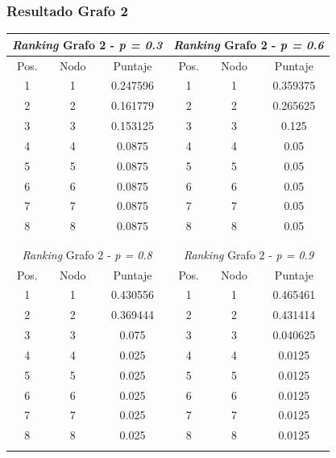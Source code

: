\subsubsection{Resultado Grafo 2}

\begin{center}
         \begin{tabular}{|c|c|c||c|c|c|}
                    \hline
                    \multicolumn{3}{|c||}{\emph{Ranking} Grafo 2 - \emph{p = 0.3}} & \multicolumn{3}{c|}{\emph{Ranking} Grafo 2 - \emph{p = 0.6}} \\ \hline
                    Pos. & Nodo & Puntaje    & Pos. & Nodo & Puntaje  \\ \hline
1 & 1 &  0.247596 & 1 & 1 & 0.359375 \\ 
2 & 2 &  0.161779 & 2 & 2 & 0.265625 \\
3 & 3 &  0.153125  & 3 & 3 & 0.125 \\
4 & 4 &  0.0875  & 4 & 4 &  0.05 \\
5 & 5 &  0.0875  & 5 & 5 &  0.05 \\
6 & 6 &  0.0875  & 6 & 6 &  0.05 \\
7 & 7 &  0.0875  & 7 & 7 &  0.05 \\
8 & 8 &  0.0875  & 8 & 8 &  0.05 \\
 \\ \hline
                    \multicolumn{6}{c}{} \\ \hline
                    \multicolumn{3}{|c||}{\emph{Ranking} Grafo 2 - \emph{p = 0.8}} & \multicolumn{3}{c|}{\emph{Ranking} Grafo 2 - \emph{p = 0.9}} \\ \hline
                    Pos. & Nodo & Puntaje    & Pos. & Nodo & Puntaje  \\ \hline
1 & 1 & 0.430556 & 1 & 1 & 0.465461 \\ 
2 & 2 & 0.369444 & 2 & 2 & 0.431414 \\
3 & 3 & 0.075  & 3 & 3 & 0.040625 \\
4 & 4 & 0.025  & 4 & 4 & 0.0125 \\
5 & 5 & 0.025  & 5 & 5 & 0.0125 \\
6 & 6 & 0.025  & 6 & 6 & 0.0125 \\
7 & 7 & 0.025  & 7 & 7 & 0.0125 \\
8 & 8 & 0.025  & 8 & 8 & 0.0125 \\

 \\ \hline

                \end{tabular}
            \end{center}
   
